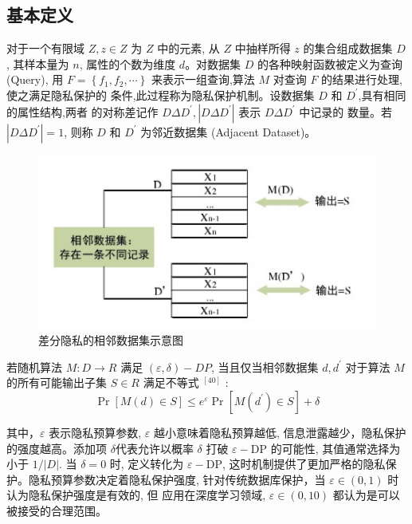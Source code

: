 \subsection{基本定义}
对于一个有限域 $Z, z \in Z$ 为 $Z$ 中的元素, 从 $Z$ 中抽样所得 $z$ 的集合组成数据集 $D$, 其样本量为 $n$, 属性的个数为维度 $d$。对数据集 $D$ 的各种映射函数被定义为查询 (Query), 用 $F=\left\{f_{1}, f_{2}, \cdots\right\}$ 来表示一组查询,算法 $M$ 对查询 $F$ 的结果进行处理,使之满足隐私保护的 条件,此过程称为隐私保护机制。设数据集 $D$ 和 $D^{\prime}$,具有相同的属性结构,两者 的对称差记作 $D \Delta D^{\prime},\left|D \Delta D^{\prime}\right|$ 表示 $D \Delta D^{\prime}$ 中记录的 数量。若 $\left|D \Delta D^{\prime}\right|=1$, 则称 $D$ 和 $D^{\prime}$ 为邻近数据集 (Adjacent Dataset)。
\begin{figure}[!hbt]
\centering
	\includegraphics[scale=0.7]{fig2/C2/相邻数据集示意图}%
	\caption{差分隐私的相邻数据集示意图}
	\label{fig:相邻数据集示意图}	
\end{figure}


\begin{define}[成立条件]\label{成立条件}

若随机算法 $M: D \rightarrow R$ 满足 $(\varepsilon, \delta)-D P$, 当且仅当相邻数据集 $d, d^{\prime}$ 对于算法 $M$ 的所有可能输出子集 $S \in R$ 满足不等式 $^{[40]}$ :
$$
\operatorname{Pr}[M(d) \in S] \leq e^{\varepsilon} \operatorname{Pr}\left[M\left(d^{\prime}\right) \in S\right]+\delta
$$

其中，$\varepsilon$ 表示隐私预算参数, $\varepsilon$ 越小意味着隐私预算越低, 信息泄露越少，隐私保护的强度越高。添加项 $\delta$代表允许以概率 $\delta$ 打破 $\varepsilon-\mathrm{DP}$ 的可能性, 其值通常选择为小于 $1 /|D|$. 当 $\delta=0$ 时, 定义转化为 $\varepsilon-\mathrm{DP}$, 这时机制提供了更加严格的隐私保护。隐私预算参数决定着隐私保护强度, 针对传统数据库保护，当 $\varepsilon \in(0,1)$ 时认为隐私保护强度是有效的, 但 应用在深度学习领域, $\varepsilon \in(0,10)$ 都认为是可以被接受的合理范围。

\end{define}

